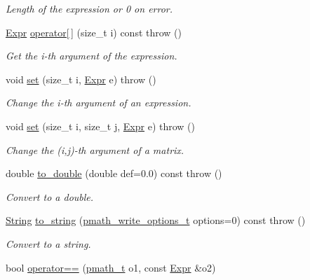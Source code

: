 \begin{CompactItemize}
\begin{CompactList}\small\item\em Length of the expression or 0 on error. \item\end{CompactList}\item 
\hyperlink{classpmath_1_1_expr}{Expr} \hyperlink{classpmath_1_1_expr_b8784170db7ff959775d13071a8f724e}{operator\mbox{[}$\,$\mbox{]}} (size\_\-t i) const   throw ()
\begin{CompactList}\small\item\em Get the i-th argument of the expression. \item\end{CompactList}\item 
void \hyperlink{classpmath_1_1_expr_4c9da925b018a1752a4cf1b21b7b634d}{set} (size\_\-t i, \hyperlink{classpmath_1_1_expr}{Expr} e)  throw ()
\begin{CompactList}\small\item\em Change the i-th argument of an expression. \item\end{CompactList}\item 
void \hyperlink{classpmath_1_1_expr_7891114e80246ac205bf1bc2179319e3}{set} (size\_\-t i, size\_\-t j, \hyperlink{classpmath_1_1_expr}{Expr} e)  throw ()
\begin{CompactList}\small\item\em Change the (i,j)-th argument of a matrix. \item\end{CompactList}\item 
double \hyperlink{classpmath_1_1_expr_69a3a8aea77a499ec61f13616c92db86}{to\_\-double} (double def=0.0) const   throw ()
\begin{CompactList}\small\item\em Convert to a double. \item\end{CompactList}\item 
\hyperlink{classpmath_1_1_string}{String} \hyperlink{classpmath_1_1_expr_4d5eb55adc498f44bdc6a5eb8affecaa}{to\_\-string} (\hyperlink{group__objects_gd83ea6a616c49cbe35b5d3dafb877f7e}{pmath\_\-write\_\-options\_\-t} options=0) const   throw ()
\begin{CompactList}\small\item\em Convert to a string. \item\end{CompactList}\item 
\hypertarget{classpmath_1_1_expr_36646586224dd20b3044e0e2f4b4e60c}{
bool \hyperlink{classpmath_1_1_expr_36646586224dd20b3044e0e2f4b4e60c}{operator==} (\hyperlink{classpmath__t}{pmath\_\-t} o1, const \hyperlink{classpmath_1_1_expr}{Expr} \&o2)}
\label{classpmath_1_1_expr_36646586224dd20b3044e0e2f4b4e60c}


\end{CompactItemize}
